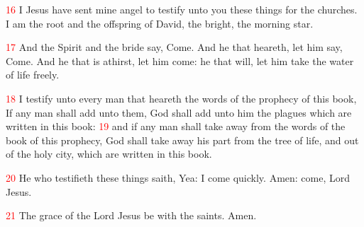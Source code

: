 \documentclass[12pt,twoside]{memoir}
\newcommand{\vnum}[1]{\textcolor{red}{\normalsize{#1}}}
\begin{document}
\vnum{16} I Jesus have sent mine angel to testify unto you these things for the churches. I am the root and the offspring of David, the bright, the morning star.

\vnum{17} And the Spirit and the bride say, Come. And he that heareth, let him say, Come. And he that is athirst, let him come: he that will, let him take the water of life freely.

\vnum{18} I testify unto every man that heareth the words of the prophecy of this book, If any man shall add unto them, God shall add unto him the plagues which are written in this book: 
\vnum{19} and if any man shall take away from the words of the book of this prophecy, God shall take away his part from the tree of life, and out of the holy city, which are written in this book.

\vnum{20} He who testifieth these things saith, Yea: I come quickly. Amen: come, Lord Jesus.

\vnum{21} The grace of the Lord Jesus be with the saints. Amen.
\end{document}
